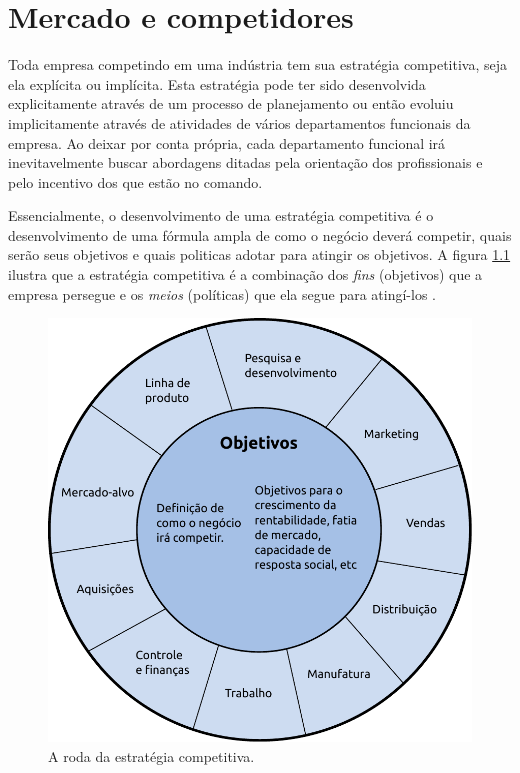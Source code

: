 \chapter{Mercado e competidores} 

Toda empresa competindo em uma indústria tem sua estratégia competitiva,
seja ela explícita ou implícita.   Esta estratégia pode ter sido desenvolvida
explicitamente através de um processo de planejamento ou então evoluiu
implicitamente através de atividades de vários departamentos funcionais da
empresa.   Ao deixar por conta própria, cada departamento funcional irá 
inevitavelmente buscar abordagens ditadas pela orientação dos profissionais
e pelo incentivo dos que estão no comando.

Essencialmente, o desenvolvimento de uma estratégia competitiva é o
desenvolvimento de uma fórmula ampla de como o negócio deverá competir,
quais serão seus objetivos e quais politicas adotar para atingir os objetivos.
A figura \ref{estrategia} ilustra que a estratégia competitiva é a combinação
dos \textit{fins} (objetivos) que a empresa persegue e os \textit{meios}
(políticas) que ela segue para atingí-los \cite{slack2009operations}.  

\begin{figure}[!h]
	\begin{center}
		\includegraphics[scale=0.65]{../slides/imagens/estrategia.pdf}
	\end{center}
	\caption{\label{estrategia} A roda da estratégia competitiva.}
\end{figure}
